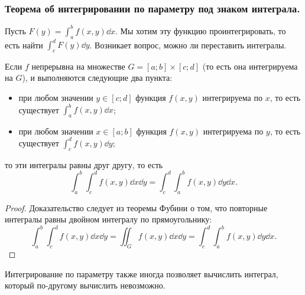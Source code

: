 \subsubsection{Теорема об интегрировании по параметру под знаком интеграла.}

Пусть $F(y) = \int_a^b f(x, y) \dd x$. Мы хотим эту функцию проинтегрировать, то есть найти $\int_c^d F(y) \dd y$. Возникает вопрос, можно ли переставить интегралы.

\begin{theorem*}
    Если $f$ непрерывна на множестве $G = [a; b] \times [c; d]$ (то есть она интегрируема на $G$), и выполняются следующие два пункта:
    \begin{itemize}
    \item 
        при любом значении $y \in [c; d]$ функция $f(x, y)$ интегрируема по $x$, то есть существует $\int_a^b f(x, y) \dd x$;

    \item 
        при любом значении $x \in [a; b]$ функция $f(x, y)$ интегрируема по $y$, то есть существует $\int_c^d f(x, y) \dd y$;
    \end{itemize}

    то эти интегралы равны друг другу, то есть
    \begin{equation*}
        \int_a^b \int_c^d f(x, y) \dd x \dd y
        = \int_c^d \int_a^b f(x, y) \dd y \dd x.
    \end{equation*}
\end{theorem*}

\begin{proof}
    Доказательство следует из теоремы Фубини о том, что повторные интегралы равны двойном интегралу по прямоугольнику:
    \begin{equation*}
        \int_a^b \int_c^d f(x, y) \dd x \dd y
        = \iint_G f(x, y) \dd x \dd y
        = \int_c^d \int_a^b f(x, y) \dd y \dd x.
    \end{equation*}
\end{proof}

Интегрирование по параметру также иногда позволяет вычислить интеграл, который по-другому вычислить невозможно.